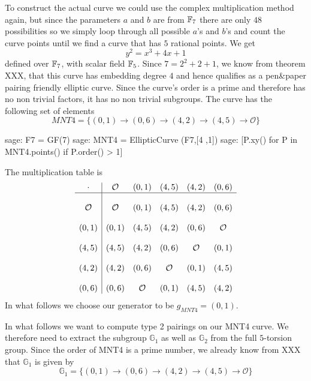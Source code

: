 To construct the actual curve we could use the complex multiplication method again, but since the parameters $a$ and $b$ are from $\mathbb{F}_7$ there are only $48$ possibilities so we simply loop through all possible $a$'s and $b$'s and count the curve points until we find a curve that has $5$ rational points. We get
$$
y^2 = x^3 + 4x + 1
$$
defined over $\mathbb{F}_7$, with scalar field $\mathbb{F}_5$. Since $7= 2^2+2+1$, we know from theorem XXX, that this curve has embedding degree $4$ and hence qualifies as a pen\&{}paper pairing friendly elliptic curve. Since the curve's order is a prime and therefore has no non trivial factors, it has no non trivial subgroups. The curve has the following set of elements
$$MNT4=\{(0,1)\to (0,6)\to (4,2)\to (4,5) \to \mathcal{O}\}$$ 
\begin{sagecommandline}
sage: F7 = GF(7)
sage: MNT4 = EllipticCurve (F7,[4 ,1])
sage: [P.xy() for P in MNT4.points() if P.order() > 1]
\end{sagecommandline}
The multiplication table is
\begingroup
    \fontsize{10pt}{10pt}\selectfont
$$
\begin{array}{c|ccccc}
\cdot & \mathcal{O} & (0,1) & (4,5) & (4,2) & (0,6)\\
\hline
\\
\mathcal{O} & \mathcal{O} & (0,1) & (4,5) & (4,2) & (0,6)\\
\\
(0,1) & (0,1) & (4,5) & (4,2) & (0,6) & \mathcal{O}\\
\\
(4,5) & (4,5) & (4,2) & (0,6) & \mathcal{O} & (0,1)\\
\\
(4,2) & (4,2) & (0,6) & \mathcal{O} & (0,1) & (4,5)\\
\\
(0,6) & (0,6) & \mathcal{O} & (0,1) & (4,5) & (4,2)\\
\end{array}
$$
\endgroup
In what follows we choose our generator to be $g_{MNT4}=(0,1)$.

In what follows we want to compute type 2 pairings on our MNT4 curve. We therefore need to extract the subgroup $\mathbb{G}_1$ as well as $\mathbb{G}_2$ from the full $5$-torsion group. Since the order of MNT4 is a prime number, we already know from XXX that $\mathbb{G}_1$ is given by  
$$\mathbb{G}_1=\{(0,1)\to (0,6)\to (4,2)\to (4,5) \to \mathcal{O}\}$$ 


